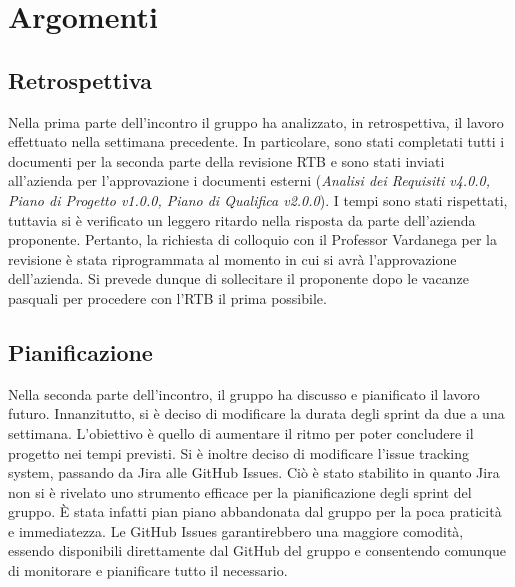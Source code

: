 \section{Argomenti}
\subsection{Retrospettiva}
Nella prima parte dell'incontro il gruppo ha analizzato, in retrospettiva, il lavoro effettuato nella settimana precedente.
In particolare, sono stati completati tutti i documenti per la seconda parte della revisione RTB e sono stati inviati all'azienda per l'approvazione i documenti esterni 
(\textit{Analisi dei Requisiti v4.0.0, Piano di Progetto v1.0.0, Piano di Qualifica v2.0.0}). I tempi sono stati rispettati, tuttavia si è verificato un 
leggero ritardo nella risposta da parte dell'azienda proponente. Pertanto, la richiesta di colloquio con il Professor Vardanega per la revisione è stata 
riprogrammata al momento in cui si avrà l'approvazione dell'azienda. 
Si prevede dunque di sollecitare il proponente dopo le vacanze pasquali per procedere con l'RTB il prima possibile.

\subsection{Pianificazione}
\noindent Nella seconda parte dell'incontro, il gruppo ha discusso e pianificato il lavoro futuro. Innanzitutto, si è deciso di modificare la durata degli sprint da due a una settimana. 
L'obiettivo è quello di aumentare il ritmo per poter concludere il progetto nei tempi previsti. Si è inoltre deciso di modificare l'issue tracking system, passando da Jira alle GitHub 
Issues. Ciò è stato stabilito in quanto Jira non si è rivelato uno strumento efficace per la pianificazione degli sprint del gruppo. È stata infatti pian piano abbandonata dal gruppo 
per la poca praticità e immediatezza. Le GitHub Issues garantirebbero una maggiore comodità, essendo disponibili direttamente dal GitHub del gruppo e consentendo comunque di monitorare 
e pianificare tutto il necessario. 
\bigskip

